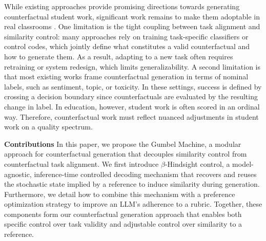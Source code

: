 \documentclass[letterpaper]{article} %
\begin{document}
While existing approaches provide promising directions towards generating counterfactual student work, significant work remains to make them adoptable in real classrooms \cite{filighera_towards_2022}. One limitation is the tight coupling between task alignment and similarity control: many approaches rely on training task-specific classifiers or control codes, which jointly define what constitutes a valid counterfactual and how to generate them. As a result, adapting to a new task often requires retraining or system redesign, which limits generalizability. A second limitation is that most existing works frame counterfactual generation in terms of nominal labels, such as sentiment, topic, or toxicity. In these settings, success is defined by crossing a decision boundary since counterfactuals are evaluated by the resulting change in label. %
In education, however, student work is often scored in an ordinal way. Therefore, counterfactual work must reflect nuanced adjustments in student work on a quality spectrum.


\textbf{Contributions} In this paper, we propose the Gumbel Machine, a modular approach for counterfactual generation that decouples similarity control from counterfactual task alignment. We first introduce $\beta$-Hindsight control, a model-agnostic, inference-time controlled decoding mechanism that recovers and reuses the stochastic state implied by a reference to induce similarity during generation. Furthermore, we detail how to combine this mechanism with a preference optimization strategy to improve an LLM's adherence to a rubric. Together, these components form our counterfactual generation approach that enables both specific control over task validity and adjustable control over similarity to a reference.
\end{document}

